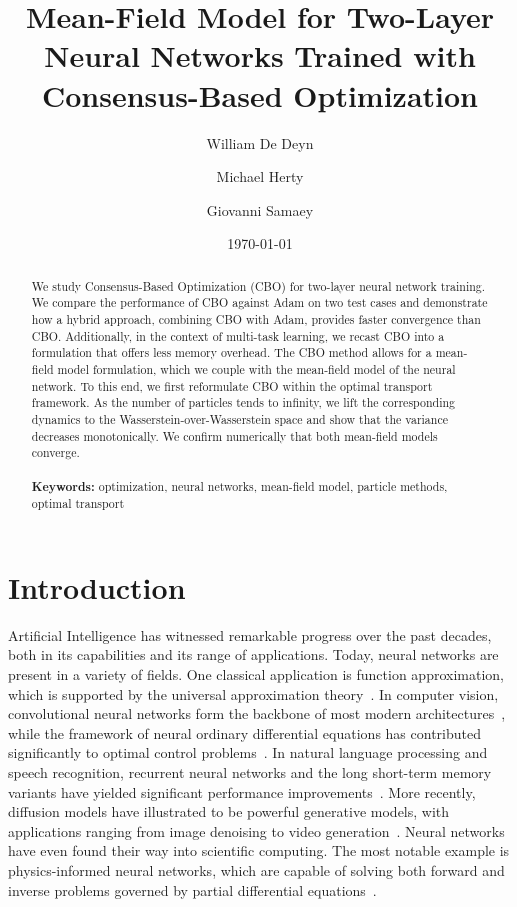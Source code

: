 \documentclass[a4paper, 11pt]{article}
\title{Mean-Field Model for Two-Layer Neural Networks Trained with Consensus-Based Optimization}
\author[1,2]{William De Deyn}
\author[1,3]{Michael Herty}
\author[2]{Giovanni Samaey}
\affil[1]{Institut f{\"u}r Geometrie und Praktische Mathematik, RWTH Aachen University, Germany}
\affil[2]{Department of Computer Science, KU Leuven, Belgium}
\affil[3]{Extraordinary Professor, Department of Mathematics and Applied Mathematics, University of Pretoria, South Africa}
\date{\today}
\theoremstyle{plain} %
\begin{document}
	\maketitle

	\begin{abstract}
	\noindent
	We study Consensus-Based Optimization (CBO) for two-layer neural network training. We compare the performance of CBO against Adam on two test cases and demonstrate how a hybrid approach, combining CBO with Adam, provides faster convergence than CBO. Additionally, in the context of multi-task learning, we recast CBO into a formulation that offers less memory overhead. The CBO method allows for a mean-field model formulation, which we couple with the mean-field model of the neural network. To this end, we first reformulate CBO within the optimal transport framework. As the number of particles tends to infinity, we lift the corresponding dynamics to the Wasserstein-over-Wasserstein space and show that the variance decreases monotonically. We confirm numerically that both mean-field models converge.\\
	\\
	\noindent
	\textbf{Keywords:} optimization, neural networks, mean-field model, particle methods, optimal transport
	\end{abstract}

	\section{Introduction}
	Artificial Intelligence has witnessed remarkable progress over the past decades, both in its capabilities and its range of applications. Today, neural networks are present in a variety of fields. One classical application is function approximation, which is supported by the universal approximation theory~\cite{hornik1989}. In computer vision, convolutional neural networks form the backbone of most modern architectures~\cite{lecun2015,krizhevsky2017}, while the framework of neural ordinary differential equations has contributed significantly to optimal control problems~\cite{chen2018,bottcher2022}. In natural language processing and speech recognition, recurrent neural networks and the long short-term memory variants have yielded significant performance improvements~\cite{hochreiter1997,rumelhart1986}. More recently, diffusion models have illustrated to be powerful generative models, with applications ranging from image denoising to video generation~\cite{yang2024}. Neural networks have even found their way into scientific computing. The most notable example is physics-informed neural networks, which are capable of solving both forward and inverse problems governed by partial differential equations~\cite{raissi2019}. 
\end{document}
